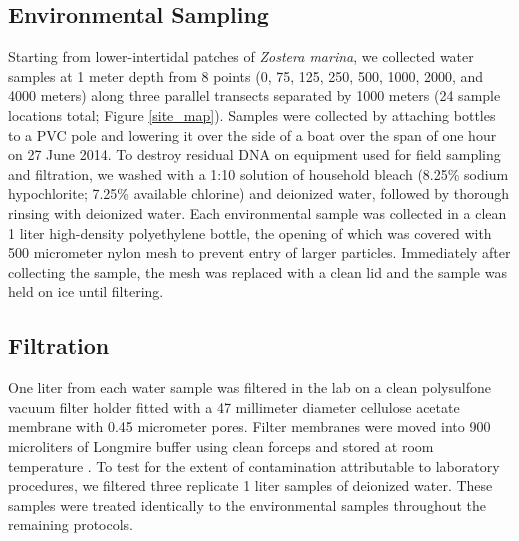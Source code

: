 \documentclass[11pt,letterpaper]{article} %
\begin{document}
\subsection*{Environmental Sampling}
Starting from lower-intertidal patches of \textit{Zostera marina}, we collected water samples at 1 meter depth from 8 points (0, 75, 125, 250, 500, 1000, 2000, and 4000 meters) along three parallel transects separated by 1000 meters (24 sample locations total; Figure \ref{site_map}). Samples were collected by attaching bottles to a PVC pole and lowering it over the side of a boat over the span of one hour on 27 June 2014. To destroy residual DNA on equipment used for field sampling and filtration, we washed with a 1:10 solution of household bleach (8.25\% sodium hypochlorite; 7.25\% available chlorine) and deionized water, followed by thorough rinsing with deionized water. Each environmental sample was collected in a clean 1 liter high-density polyethylene bottle, the opening of which was covered with 500 micrometer nylon mesh to prevent entry of larger particles. Immediately after collecting the sample, the mesh was replaced with a clean lid and the sample was held on ice until filtering.

\subsection*{Filtration}
One liter from each water sample was filtered in the lab on a clean polysulfone vacuum filter holder fitted with a 47 millimeter diameter cellulose acetate membrane with 0.45 micrometer pores. Filter membranes were moved into 900 microliters of Longmire buffer \citep{Longmire1997} using clean forceps and stored at room temperature \citep{Renshaw2015}. To test for the extent of contamination attributable to laboratory procedures, we filtered three replicate 1 liter samples of deionized water. These samples were treated identically to the environmental samples throughout the remaining protocols.
\end{document}
